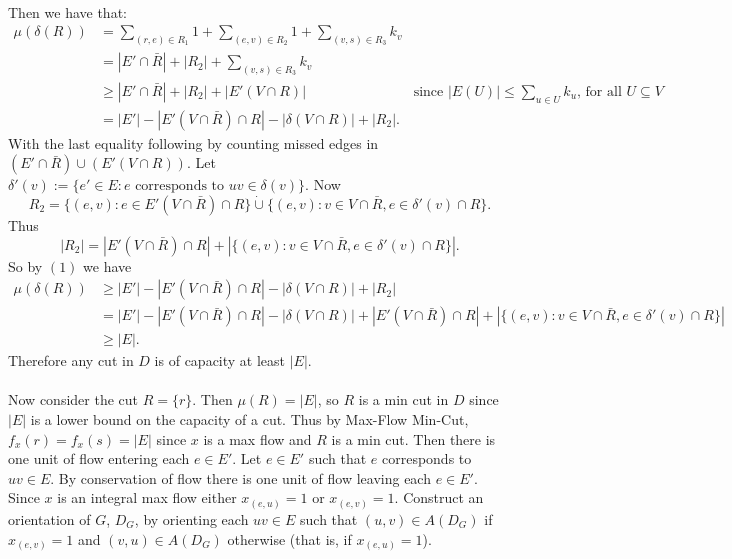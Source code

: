 \documentclass[letterpaper,12pt,oneside,onecolumn]{article}
\begin{document}
\paragraph{}
Then we have that:
\begin{align}
\mu(\delta(R)) &= \sum_{(r,e) \in R_1} 1 + \sum_{(e,v) \in R_2} 1 + \sum_{(v,s) \in R_3} k_v \nonumber\\
&= |E' \cap \bar{R}| + |R_2| + \sum_{(v,s) \in R_3} k_v \nonumber\\
&\geq |E' \cap \bar{R}| + |R_2| + |E'(V \cap R)| &\text{since $|E(U)| \leq \sum_{u \in U} k_u$, for all $U \subseteq V$} \nonumber\\
&= |E'| - |E'(V \cap \bar{R}) \cap R| - |\delta(V\cap R)| + |R_2|. 
\end{align}
With the last equality following by counting missed edges in $(E' \cap \bar{R}) \cup (E'(V \cap R))$. Let $\delta'(v) := \{e' \in E: e \text{ corresponds to } uv \in \delta(v)\}$. Now $$R_2 = \{(e,v): e \in E'(V \cap \bar{R}) \cap R \} \dot\cup \{(e,v): v \in V \cap \bar{R}, e\in \delta'(v) \cap R \}.$$ Thus $$|R_2| = |E'(V \cap \bar{R}) \cap R| + |\{(e,v): v \in V \cap \bar{R}, e\in \delta'(v) \cap R \}|.$$
So by $(1)$ we have
\begin{align*}
\mu(\delta(R)) &\geq |E'| - |E'(V \cap \bar{R}) \cap R| - |\delta(V\cap R)| + |R_2| \\
&= |E'| - |E'(V \cap \bar{R}) \cap R| - |\delta(V\cap R)| + |E'(V \cap \bar{R}) \cap R| + |\{(e,v): v \in V \cap \bar{R}, e\in \delta'(v) \cap R \}| \\
&\geq |E|.
\end{align*}
Therefore any cut in $D$ is of capacity at least $|E|$.
\paragraph{}
Now consider the cut $R = \{r\}$. Then $\mu(R) = |E|$, so $R$ is a min cut in $D$ since $|E|$ is a lower bound on the capacity of a cut. Thus by Max-Flow Min-Cut, $f_x(r) = f_x(s) = |E|$ since $x$ is a max flow and $R$ is a min cut. Then there is one unit of flow entering each $e \in E'$. Let $e \in E'$ such that $e$ corresponds to $uv \in E$. By conservation of flow there is one unit of flow leaving each $e \in E'$. Since $x$ is an integral max flow either $x_{(e,u)} = 1$ or $x_{(e,v)} = 1$. Construct an orientation of $G$, $D_G$, by orienting each $uv \in E$ such that $(u,v) \in A(D_G)$ if $x_{(e,v)} = 1$ and $(v,u) \in A(D_G)$ otherwise (that is, if $x_{(e,u)} = 1$).
\end{document}
